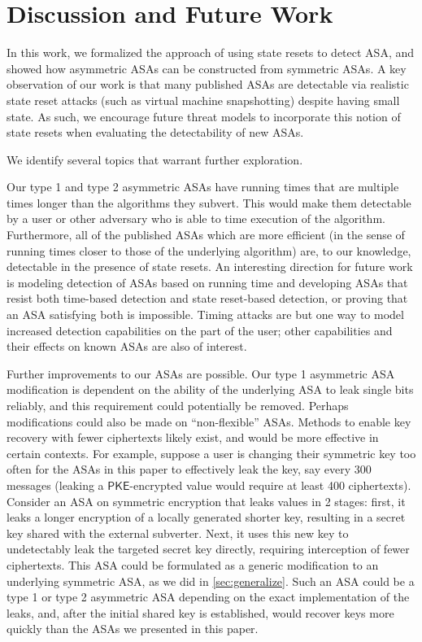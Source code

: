 \chapter{Discussion and Future Work}
In this work, we formalized the approach of using state resets to detect ASA, and showed how asymmetric ASAs can be constructed from symmetric ASAs. A key observation of our work is that many published ASAs are detectable via realistic state reset attacks (such as virtual machine snapshotting) despite having small state.  As such, we encourage future threat models to incorporate this notion of state resets when evaluating the detectability of new ASAs.

We identify several topics that warrant further exploration.

Our type 1 and type 2 asymmetric ASAs have running times that are multiple times longer than the algorithms they subvert. This would make them detectable by a user or other adversary who is able to time execution of the algorithm. Furthermore, all of the published ASAs which are more efficient (in the sense of running times closer to those of the underlying algorithm) are, to our knowledge, detectable in the presence of state resets. An interesting direction for future work is modeling detection of ASAs based on running time and developing ASAs that resist both time-based detection and state reset-based detection, or proving that an ASA satisfying both is impossible. Timing attacks are but one way to model increased detection capabilities on the part of the user; other capabilities and their effects on known ASAs are also of interest.

Further improvements to our ASAs are possible. Our type 1 asymmetric ASA modification is dependent on the ability of the underlying ASA to leak single bits reliably, and this requirement could potentially be removed. Perhaps modifications could also be made on ``non-flexible'' ASAs. Methods to enable key recovery with fewer ciphertexts likely exist, and would be more effective in certain contexts. For example, suppose a user is changing their symmetric key too often for the ASAs in this paper to effectively leak the key, say every 300 messages (leaking a $\mathsf{PKE}$-encrypted value would require at least 400 ciphertexts). Consider an ASA on symmetric encryption that leaks values in 2 stages: first, it leaks a longer encryption of a locally generated shorter key, resulting in a secret key shared with the external subverter. Next, it uses this new key to undetectably leak the targeted secret key directly, requiring interception of fewer ciphertexts. This ASA could be formulated as a generic modification to an underlying symmetric ASA, as we did in \autoref{sec:generalize}. Such an ASA could be a type 1 or type 2 asymmetric ASA depending on the exact implementation of the leaks, and, after the initial shared key is established, would recover keys more quickly than the ASAs we presented in this paper.

